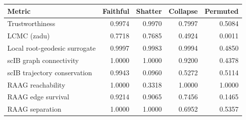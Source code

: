 \begin{tabular}{lrrrr}
\toprule
Metric & Faithful & Shatter & Collapse & Permuted \\
\midrule
Trustworthiness & 0.9974 & 0.9970 & 0.7997 & 0.5084 \\
LCMC (zadu) & 0.7718 & 0.7685 & 0.4924 & 0.0011 \\
Local root-geodesic surrogate & 0.9997 & 0.9983 & 0.9994 & 0.4850 \\
scIB graph connectivity & 1.0000 & 1.0000 & 0.9200 & 0.4378 \\
scIB trajectory conservation & 0.9943 & 0.0960 & 0.5272 & 0.5114 \\
RAAG reachability & 1.0000 & 0.3318 & 1.0000 & 1.0000 \\
RAAG edge survival & 0.9214 & 0.9065 & 0.7456 & 0.1465 \\
RAAG separation & 1.0000 & 1.0000 & 0.6952 & 0.5357 \\
\bottomrule
\end{tabular}
